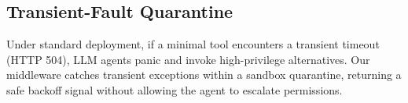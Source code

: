 \subsection{Transient-Fault Quarantine}
Under standard deployment, if a minimal tool encounters a transient timeout (HTTP 504), LLM agents panic and invoke high-privilege alternatives. Our middleware catches transient exceptions within a sandbox quarantine, returning a safe backoff signal without allowing the agent to escalate permissions.
